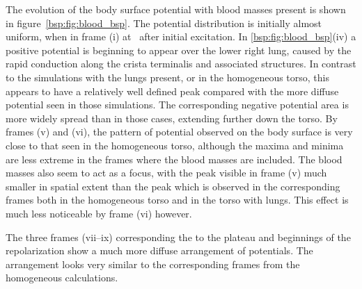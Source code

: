 The evolution of the body surface potential with blood masses present is shown in
figure~\ref{bsp:fig:blood_bsp}.
The potential distribution is initially almost uniform, when  in frame (i) at
\ after initial excitation.
In \ref{bsp:fig:blood_bsp}(iv) a positive potential is beginning to appear over
the lower right lung, caused by the rapid conduction along the crista
terminalis and associated structures.
In contrast to the simulations with the lungs present, or in the homogeneous
torso, this appears to have a relatively well defined peak compared with the
more diffuse potential seen in those simulations.
The corresponding negative potential area is more widely spread than in those
cases, extending further down the torso.
By frames (v) and (vi), the pattern of potential observed on the body surface is
very close to that seen in the homogeneous torso, although the maxima and minima
are less extreme in the frames where the blood masses are included.
The blood masses also seem to act as a focus, with the peak visible in frame (v)
much smaller in spatial extent than the peak which is observed in the
corresponding frames both in the homogeneous torso and in the torso with lungs.
This effect is much less noticeable by frame (vi) however.

The three frames (vii--ix) corresponding the to the plateau and beginnings of the
repolarization show a much more diffuse arrangement of potentials.
The arrangement looks very similar to the corresponding frames from the
homogeneous calculations.


